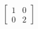 \documentclass[preview]{standalone}
\begin{document}
\begin{align*}
\begin{bmatrix} 1 & 0 \\ 0 & 2 \end{bmatrix}
\end{align*}
\end{document}
